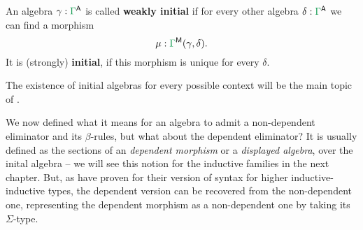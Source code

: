 \begin{defn}\label{def:ii-initiality}
An algebra $\gamma : \grm{\Gamma}^\CC$ is called \textbf{weakly initial} if
for every other algebra $\delta : \grm{\Gamma}^\CC$ we can find a morphism
\begin{equation*}
\mu : \grm{\Gamma}^\MM(\gamma, \delta) \text{.}
\end{equation*}
It is (strongly) \textbf{initial}, if this morphism is unique for every $\delta$.
\end{defn}

The existence of initial algebras for every possible context
will be the main topic of .

\begin{remark}
We now defined what it means for an algebra to admit a non-dependent eliminator
and its $\beta$-rules, but what about the dependent eliminator?
It is usually defined as the sections of an \emph{dependent morphism}
or a \emph{displayed algebra},
over the inital algebra -- we will see this notion for the inductive families in the
next chapter.
But, as \citet{constructingqiits} have proven for their version of syntax for higher
inductive-inductive
types, the dependent version can be recovered from the non-dependent one,
representing the dependent morphism as a non-dependent one by
taking its $\Sigma$-type.
\end{remark}















